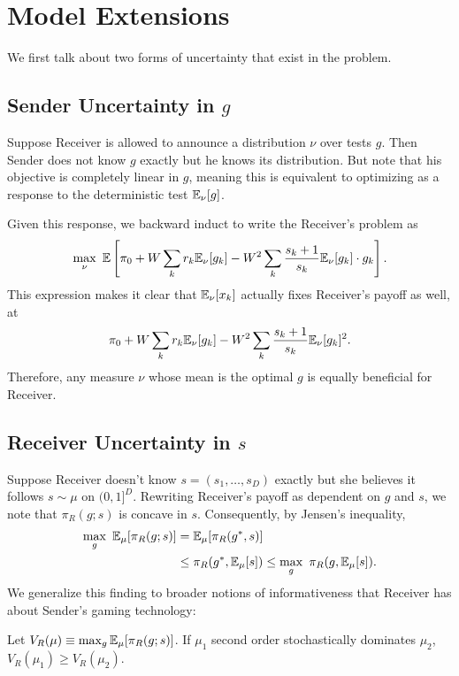 \section{Model Extensions}
\label{sec:model-extensions}

\noindent We first talk about two forms of uncertainty that exist in the problem.

\subsection{Sender Uncertainty in $g$}

Suppose Receiver is allowed to announce a distribution $\nu$ over tests $g$. Then Sender does not know $g$ exactly but he knows its distribution. But note that his objective is completely linear in $g$, meaning this is equivalent to optimizing as a response to the deterministic test $\mathbb{E}_{\nu}[g]$.

Given this response, we backward induct to write the Receiver's problem as $$\max_{\nu} \ \bbE\left[\pi_0+W\sum_k r_k\bbE_\nu[g_k]-W^2\sum_k\dfrac{s_k+1}{s_k}\bbE_\nu[g_k] \cdot g_k\right].$$ This expression makes it clear that $\mathbb{E}_\nu[x_k]$ actually fixes Receiver's payoff as well, at $$\pi_0+W\sum_k r_k\mathbb{E}_\nu[g_k]-W^2\sum_k\dfrac{s_k+1}{s_k}\mathbb{E}_\nu[g_k]^2.$$ Therefore, any measure $\nu$ whose mean is the optimal $g$ is equally beneficial for Receiver.

\subsection{Receiver Uncertainty in $s$}

Suppose Receiver doesn't know $s=(s_1,\dots,s_D)$ exactly but she believes it follows $s \sim \mu$ on $(0,1]^D$. Rewriting Receiver's payoff as dependent on $g$ and $s$, we note that $\pi_R(g;s)$ is concave in $s$. Consequently, by Jensen's inequality, \begin{align*}\max_g \ \mathbb{E}_\mu[\pi_R(g;s)]&= \mathbb{E}_\mu[\pi_R(g^*,s)] \\ &\leq \pi_R(g^*,\mathbb{E}_\mu[s])\leq \max_g \ \pi_R(g,\mathbb{E}_\mu[s]).\end{align*} We generalize this finding to broader notions of informativeness that Receiver has about Sender's gaming technology:

\begin{proposition}
    Let $V_R(\mu) \equiv \max_g \mathbb{E}_{\mu}[\pi_R(g;s)]$. If $\mu_1$ second order stochastically dominates $\mu_2$, $V_R(\mu_1) \geq V_R(\mu_2)$.
\end{proposition}


